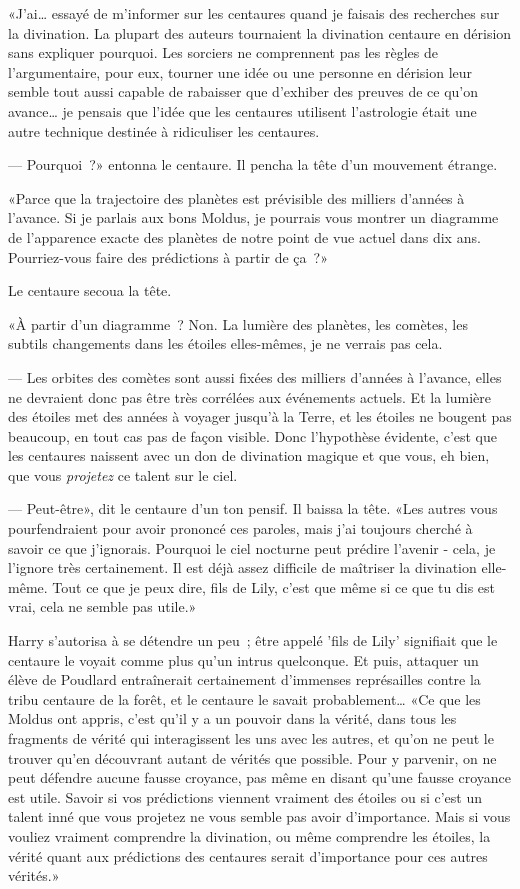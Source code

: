 «J'ai… essayé de m'informer sur les centaures quand je faisais des recherches sur la divination. La plupart des auteurs tournaient la divination centaure en dérision sans expliquer pourquoi. Les sorciers ne comprennent pas les règles de l'argumentaire, pour eux, tourner une idée ou une personne en dérision leur semble tout aussi capable de rabaisser que d'exhiber des preuves de ce qu'on avance… je pensais que l'idée que les centaures utilisent l'astrologie était une autre technique destinée à ridiculiser les centaures.

--- Pourquoi~?» entonna le centaure. Il pencha la tête d'un mouvement étrange.

«Parce que la trajectoire des planètes est prévisible des milliers d'années à l'avance. Si je parlais aux bons Moldus, je pourrais vous montrer un diagramme de l'apparence exacte des planètes de notre point de vue actuel dans dix ans. Pourriez-vous faire des prédictions à partir de ça~?»

Le centaure secoua la tête.

«À partir d'un diagramme~? Non. La lumière des planètes, les comètes, les subtils changements dans les étoiles elles-mêmes, je ne verrais pas cela.

--- Les orbites des comètes sont aussi fixées des milliers d'années à l'avance, elles ne devraient donc pas être très corrélées aux événements actuels. Et la lumière des étoiles met des années à voyager jusqu'à la Terre, et les étoiles ne bougent pas beaucoup, en tout cas pas de façon visible. Donc l'hypothèse évidente, c'est que les centaures naissent avec un don de divination magique et que vous, eh bien, que vous \emph{projetez} ce talent sur le ciel.

--- Peut-être», dit le centaure d'un ton pensif. Il baissa la tête. «Les autres vous pourfendraient pour avoir prononcé ces paroles, mais j'ai toujours cherché à savoir ce que j'ignorais. Pourquoi le ciel nocturne peut prédire l'avenir - cela, je l'ignore très certainement. Il est déjà assez difficile de maîtriser la divination elle-même. Tout ce que je peux dire, fils de Lily, c'est que même si ce que tu dis est vrai, cela ne semble pas utile.»

Harry s'autorisa à se détendre un peu~; être appelé 'fils de Lily' signifiait que le centaure le voyait comme plus qu'un intrus quelconque. Et puis, attaquer un élève de Poudlard entraînerait certainement d'immenses représailles contre la tribu centaure de la forêt, et le centaure le savait probablement… «Ce que les Moldus ont appris, c'est qu'il y a un pouvoir dans la vérité, dans tous les fragments de vérité qui interagissent les uns avec les autres, et qu'on ne peut le trouver qu'en découvrant autant de vérités que possible. Pour y parvenir, on ne peut défendre aucune fausse croyance, pas même en disant qu'une fausse croyance est utile. Savoir si vos prédictions viennent vraiment des étoiles ou si c'est un talent inné que vous projetez ne vous semble pas avoir d'importance. Mais si vous vouliez vraiment comprendre la divination, ou même comprendre les étoiles, la vérité quant aux prédictions des centaures serait d'importance pour ces autres vérités.»

